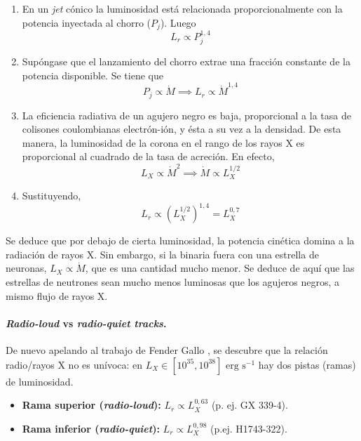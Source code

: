\begin{enumerate}
    \item En un \textit{jet} cónico la luminosidad está relacionada proporcionalmente con la potencia inyectada al chorro ($P_j$). Luego
    \begin{equation}
        L_r\propto P_j^{1,4}
    \end{equation}

    \item Supóngase que el lanzamiento del chorro extrae una fracción constante de la potencia disponible. Se tiene que
    \begin{equation}
        P_j\propto \dot{M}\implies L_r\propto \dot{M}^{1,4}
    \end{equation}

    \item La eficiencia radiativa de un agujero negro es baja, proporcional a la tasa de colisones coulombianas electrón-ión, y ésta a su vez a la densidad. De esta manera, la luminosidad de la corona en el rango de los rayos X es proporcional al cuadrado de la tasa de acreción. En efecto,
    \begin{equation}
        L_X\propto\dot{M}^2\implies\dot{M}\propto L_X^{1/2}
    \end{equation}

    \item Sustituyendo, 
    \begin{equation}
        L_r\propto(L_X^{1/2})^{1,4}=L_X^{0,7}
    \end{equation}
\end{enumerate}

\noindent Se deduce que por debajo de cierta luminosidad, la potencia cinética domina a la radiación de rayos X. Sin embargo, si la binaria fuera con una estrella de neuronas, $L_X\propto\dot{M}$, que es una cantidad mucho menor. Se deduce de aquí que las estrellas de neutrones sean mucho menos luminosas que los agujeros negros, a mismo flujo de rayos X.

\paragraph{\textit{Radio-loud} vs \textit{radio-quiet tracks}.} De nuevo apelando al trabajo de Fender Gallo \cite{fender_gallo}, se descubre que la relación radio/rayos X no es unívoca: en $L_X\in[10^{35},10^{38}]\mbox{ erg s}^{-1}$ hay dos pistas (ramas) de luminosidad.

\begin{itemize}
    \item \textbf{Rama superior (\textit{radio-loud}):} $L_r\propto L_X^{0,63}$ (p. ej. GX 339-4).
    \item \textbf{Rama inferior (\textit{radio-quiet}):} $L_r\propto L_X^{0,98}$ (p.ej. H1743-322).
\end{itemize}


